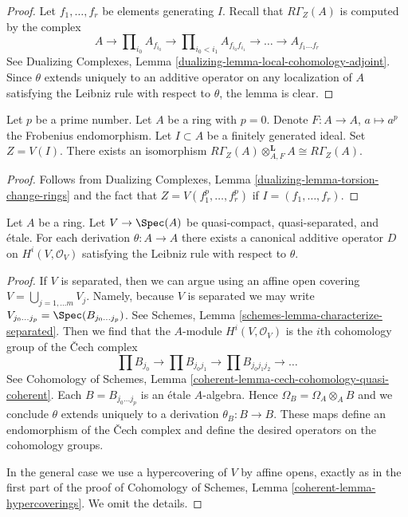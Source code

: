 \begin{proof}
Let $f_1, \ldots, f_r$ be elements generating $I$.
Recall that $R\Gamma_Z(A)$ is computed by the complex
$$
A \to \prod\nolimits_{i_0} A_{f_{i_0}} \to
\prod\nolimits_{i_0 < i_1} A_{f_{i_0}f_{i_1}}
\to \ldots \to A_{f_1\ldots f_r}
$$
See Dualizing Complexes, Lemma \ref{dualizing-lemma-local-cohomology-adjoint}.
Since $\theta$ extends uniquely to an additive operator on
any localization of $A$ satisfying the Leibniz rule with
respect to $\theta$, the lemma is clear.
\end{proof}

\begin{lemma}
\label{lemma-frobenius}
Let $p$ be a prime number. Let $A$ be a ring with $p = 0$.
Denote $F : A \to A$, $a \mapsto a^p$ the Frobenius endomorphism.
Let $I \subset A$ be a finitely generated ideal. Set $Z = V(I)$.
There exists an isomorphism
$R\Gamma_Z(A) \otimes_{A, F}^\mathbf{L} A \cong R\Gamma_Z(A)$.
\end{lemma}

\begin{proof}
Follows from Dualizing Complexes, Lemma
\ref{dualizing-lemma-torsion-change-rings}
and the fact that $Z = V(f_1^p, \ldots, f_r^p)$
if $I = (f_1, \ldots, f_r)$.
\end{proof}

\begin{lemma}
\label{lemma-etale-derivation}
Let $A$ be a ring. Let $V \to \Spec(A)$ be quasi-compact, quasi-separated,
and \'etale. For each derivation $\theta : A \to A$ there exists a canonical
additive operator $D$ on $H^i(V, \mathcal{O}_V)$
satisfying the Leibniz rule with respect to $\theta$.
\end{lemma}

\begin{proof}
If $V$ is separated, then we can argue using an affine open covering
$V = \bigcup_{j = 1, \ldots m} V_j$. Namely, because $V$ is separated
we may write $V_{j_0 \ldots j_p} = \Spec(B_{j_0 \ldots j_p})$.
See Schemes, Lemma \ref{schemes-lemma-characterize-separated}. Then we
find that the $A$-module $H^i(V, \mathcal{O}_V)$
is the $i$th cohomology group of the {\v C}ech complex
$$
\prod B_{j_0} \to
\prod B_{j_0j_1} \to
\prod B_{j_0j_1j_2} \to \ldots
$$
See Cohomology of Schemes, Lemma
\ref{coherent-lemma-cech-cohomology-quasi-coherent}.
Each $B = B_{j_0 \ldots j_p}$ is an \'etale $A$-algebra.
Hence $\Omega_B = \Omega_A \otimes_A B$ and we conclude
$\theta$ extends uniquely to a derivation $\theta_B : B \to B$.
These maps define an endomorphism of the {\v C}ech complex
and define the desired operators on the cohomology groups.

\medskip\noindent
In the general case we use a hypercovering of $V$ by
affine opens, exactly as in the first part of the proof of
Cohomology of Schemes, Lemma \ref{coherent-lemma-hypercoverings}.
We omit the details.
\end{proof}

